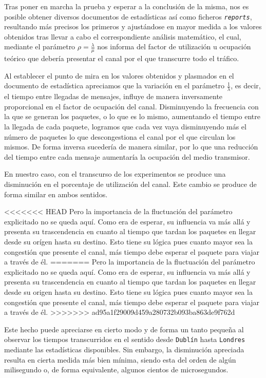 \documentclass{article}[10pt]
\begin{document}
		Tras poner en marcha la prueba y esperar a la conclusión de la misma, nos es posible obtener diversos documentos de estadísticas así como ficheros \texttt{\textit{reports}}, resultando más precisos los primeros y ajustándose en mayor medida a los valores obtenidos tras llevar a cabo el correspondiente análisis matemático, el cual, mediante el parámetro $\rho = \frac{\lambda}{\mu}$ nos informa del factor de utilización u ocupación teórico que debería presentar el canal por el que transcurre todo el tráfico.

		Al establecer el punto de mira en los valores obtenidos y plasmados en el documento de estadística apreciamos que la variación en el parámetro $\frac{1}{\lambda}$, es decir, el tiempo entre llegadas de mensajes, influye de manera inversamente proporcional en el factor de ocupación del canal. Disminuyendo la frecuencia con la que se generan los paquetes, o lo que es lo mismo, aumentando el tiempo entre la llegada de cada paquete, logramos que cada vez vaya disminuyendo más el número de paquetes lo que descongestiona el canal por el que circulan los mismos. De forma inversa sucedería de manera similar, por lo que una reducción del tiempo entre cada mensaje aumentaría la ocupación del medio transmisor.

		En nuestro caso, con el transcurso de los experimentos se produce una disminución en el porcentaje de utilización del canal. Este cambio se produce de forma similar en ambos sentidos.

<<<<<<< HEAD
		Pero la importancia de la fluctuación del parámetro explicitado no se queda aquí. Como era de esperar, su influencia va más allá y presenta su trascendencia en cuanto al tiempo que tardan los paquetes en llegar desde su orígen hasta su destino. Esto tiene su lógica pues cuanto mayor sea la congestión que presente el canal, más tiempo debe esperar el paquete para viajar a través de él.
=======
		Pero la importancia de la fluctuación del parámetro explicitado no se queda aquí. Como era de esperar, su influencia va más allá y presenta su trascendencia en cuanto al tiempo que tardan los paquetes en llegar desde su origen hasta su destino. Esto tiene su lógica pues cuanto mayor sea la congestión que presente el canal, más tiempo debe esperar el paquete para viajar a través de él.
>>>>>>> ad95a1f29009d459a280732b093ba863de9f762d

		Este hecho puede apreciarse en cierto modo y de forma un tanto pequeña al observar los tiempos transcurridos en el sentido desde \texttt{Dublín} hasta \texttt{Londres} mediante las estadísticas disponibles. Sin embargo, la disminución apreciada resulta en cierta medida más bien mínima, siendo esta del orden de algún milisegundo o, de forma equivalente, algunos cientos de microsegundos.
\end{document}
